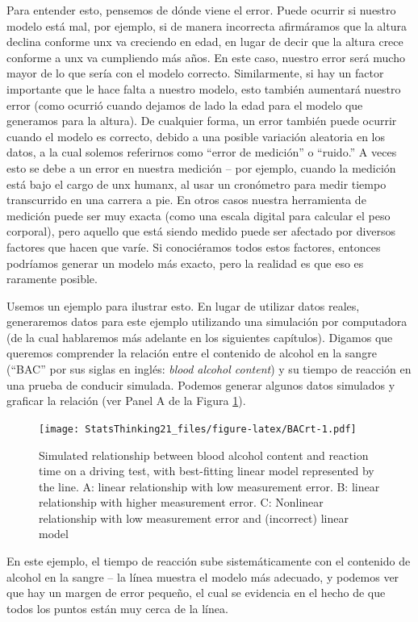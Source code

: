 \documentclass[
  12pt,
]{book}
\begin{document}
Para entender esto, pensemos de dónde viene el error. Puede ocurrir si nuestro modelo está mal, por ejemplo, si de manera incorrecta afirmáramos que la altura declina conforme unx va creciendo en edad, en lugar de decir que la altura crece conforme a unx va cumpliendo más años. En este caso, nuestro error será mucho mayor de lo que sería con el modelo correcto. Similarmente, si hay un factor importante que le hace falta a nuestro modelo, esto también aumentará nuestro error (como ocurrió cuando dejamos de lado la edad para el modelo que generamos para la altura). De cualquier forma, un error también puede ocurrir cuando el modelo es correcto, debido a una posible variación aleatoria en los datos, a la cual solemos referirnos como ``error de medición'' o ``ruido.'' A veces esto se debe a un error en nuestra medición -- por ejemplo, cuando la medición está bajo el cargo de unx humanx, al usar un cronómetro para medir tiempo transcurrido en una carrera a pie. En otros casos nuestra herramienta de medición puede ser muy exacta (como una escala digital para calcular el peso corporal), pero aquello que está siendo medido puede ser afectado por diversos factores que hacen que varíe. Si conociéramos todos estos factores, entonces podríamos generar un modelo más exacto, pero la realidad es que eso es raramente posible.

Usemos un ejemplo para ilustrar esto. En lugar de utilizar datos reales, generaremos datos para este ejemplo utilizando una simulación por computadora (de la cual hablaremos más adelante en los siguientes capítulos). Digamos que queremos comprender la relación entre el contenido de alcohol en la sangre (``BAC'' por sus siglas en inglés: \emph{blood alcohol content}) y su tiempo de reacción en una prueba de conducir simulada. Podemos generar algunos datos simulados y graficar la relación (ver Panel A de la Figura \ref{fig:BACrt}).

\begin{figure}
\centering
\texttt{[image: StatsThinking21\_files/figure-latex/BACrt-1.pdf]}
\caption{\label{fig:BACrt}Simulated relationship between blood alcohol content and reaction time on a driving test, with best-fitting linear model represented by the line. A: linear relationship with low measurement error. B: linear relationship with higher measurement error. C: Nonlinear relationship with low measurement error and (incorrect) linear model}
\end{figure}

En este ejemplo, el tiempo de reacción sube sistemáticamente con el contenido de alcohol en la sangre -- la línea muestra el modelo más adecuado, y podemos ver que hay un margen de error pequeño, el cual se evidencia en el hecho de que todos los puntos están muy cerca de la línea.
\end{document}
